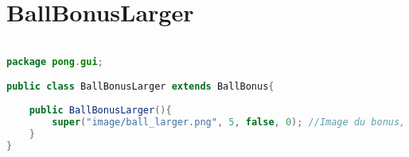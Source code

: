 \section{BallBonusLarger}
\begin{lstlisting}[language=Java]

package pong.gui;

public class BallBonusLarger extends BallBonus{
	
	public BallBonusLarger(){
		super("image/ball_larger.png", 5, false, 0); //Image du bonus, frequence, malus, numBonus
	}
}
\end{lstlisting}
